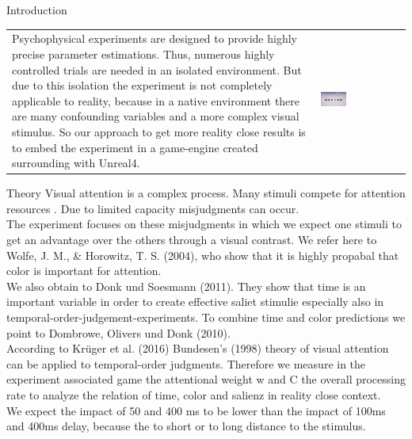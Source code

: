 \documentclass[a0paper,portrait]{baposter}
\begin{document}
\begin{poster}
{		}
		
		
		
		\begin{posterbox}[name=intro,span=2,column=0,row=0]{Introduction}
			\begin{tabular}{p{} p{}}
				Psychophysical experiments are designed to provide highly precise parameter estimations. Thus, numerous highly controlled trials are needed in an isolated environment. But due to this isolation the experiment is not completely applicable to reality, because in a native environment there are many confounding variables and a more complex visual stimulus.
				So our approach to get more reality close results is to embed the experiment in a game-engine created surrounding with Unreal4.
				& 
				\vspace{-5pt}
				\includegraphics[width=0.32\textwidth]{Screenshots/playerDecision.png}\\
			\end{tabular}
			
		\end{posterbox}
		
		\begin{posterbox}[name=theory,column=0,row=1,below=intro]{Theory}
			\vspace{10pt}
			Visual attention is a complex process. Many stimuli compete for attention resources . Due to limited capacity misjudgments can occur.\\ The experiment focuses on these misjudgments in which we expect one stimuli to get an advantage over the others through a visual contrast. We refer here to Wolfe, J. M., \& Horowitz, T. S. (2004), who show that it is highly propabal that color is important for attention.\\
			 We also obtain to Donk und Soesmann (2011). They show that time is an important variable in order to create effective saliet stimulie especially also in temporal-order-judgement-experiments. To combine time and color predictions we point to Dombrowe, Olivers und Donk (2010).\\ According to Krüger et al. (2016) Bundesen's (1998) theory of visual attention can be applied to temporal-order judgments. Therefore we measure in the experiment associated game the attentional weight w and C the overall processing rate to analyze the relation of time, color and salienz in reality close context.\\
			 We expect the impact of 50 and 400 ms to be lower than the impact of 100ms and 400ms delay, because the to short or to long distance to the stimulus.
			 \vspace{18pt}
		\end{posterbox}
		

\end{poster}
\end{document}
